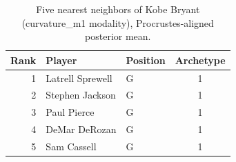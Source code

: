 \begin{table}[htbp]
  \centering\small
  \begin{tabular}{rllc}
    \toprule
    Rank & Player & Position & Archetype \\
    \midrule
    1 & Latrell Sprewell & G & 1 \\
    2 & Stephen Jackson & G & 1 \\
    3 & Paul Pierce & G & 1 \\
    4 & DeMar DeRozan & G & 1 \\
    5 & Sam Cassell & G & 1 \\
    \bottomrule
  \end{tabular}
  \caption{Five nearest neighbors of Kobe Bryant (curvature_m1 modality), Procrustes-aligned posterior mean.}
  \label{tab:Kobe_Bryant_neighbors_curvature_m1}
\end{table}


